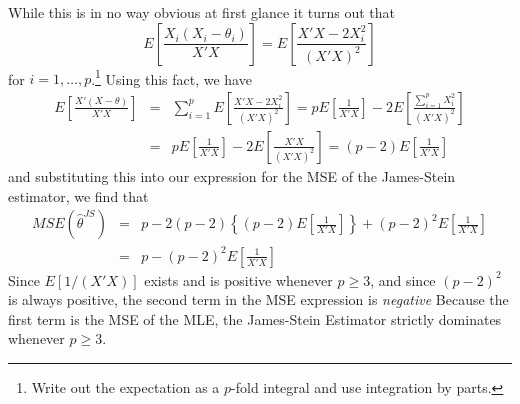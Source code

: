 While this is in no way obvious at first glance it turns out that 
\begin{equation*}
  E\left[ \frac{X_i(X_i - \theta_i)}{X'X} \right] = E\left[ \frac{X'X - 2 X_i^2}{\left( X'X \right)^2} \right]
\end{equation*}
for $i = 1, \hdots, p$.\footnote{Write out the expectation as a $p$-fold integral and use integration by parts.}
Using this fact, we have
\begin{eqnarray*}
  E\left[ \frac{X'(X-\theta)}{X'X} \right] &=&  \sum_{i=1}^{p} E\left[ \frac{X'X - 2 X_i^2}{\left( X'X \right)^2} \right] = p E\left[ \frac{1}{X'X} \right] - 2 E\left[ \frac{\sum_{i=1}^{p} X_i^2}{(X'X)^2} \right]\\
  &=& p E\left[ \frac{1}{X'X} \right] - 2 E\left[ \frac{X'X}{(X'X)^2} \right] = \left( p-2 \right)E\left[ \frac{1}{X'X} \right]
\end{eqnarray*}
and substituting this into our expression for the MSE of the James-Stein estimator, we find that
\begin{eqnarray*}
  MSE\left( \hat{\theta}^{JS} \right) &=& p - 2(p-2)\left\{ \left( p-2 \right) E\left[ \frac{1}{X'X} \right] \right\} + \left( p-2 \right)^{2}E\left[ \frac{1}{X'X} \right]\\
  &=& p - \left( p-2 \right)^2 E\left[ \frac{1}{X'X} \right]
\end{eqnarray*}
Since $E[1/(X'X)]$ exists and is positive whenever $p \geq 3$, and since $(p-2)^2$ is always positive, the second term in the MSE expression is \emph{negative}
Because the first term is the MSE of the MLE, the James-Stein Estimator strictly dominates whenever $p\geq 3$.



